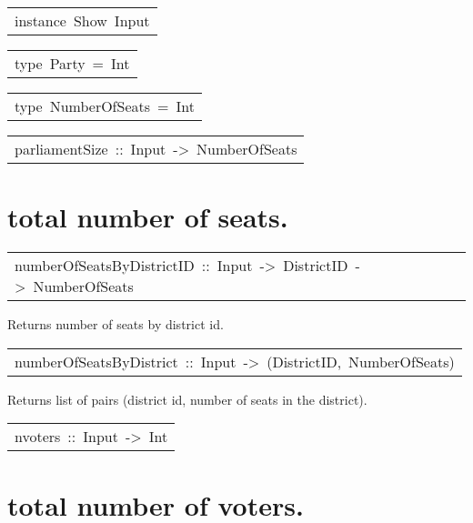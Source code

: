 \begin{haddockdesc}
\item[\begin{tabular}{@{}l}
instance\ Show\ Input
\end{tabular}]
\end{haddockdesc}
\begin{haddockdesc}
\item[\begin{tabular}{@{}l}
type\ Party\ =\ Int
\end{tabular}]
\end{haddockdesc}
\begin{haddockdesc}
\item[\begin{tabular}{@{}l}
type\ NumberOfSeats\ =\ Int
\end{tabular}]
\end{haddockdesc}
\begin{haddockdesc}
\item[\begin{tabular}{@{}l}
parliamentSize\ ::\ Input\ ->\ NumberOfSeats
\end{tabular}]\haddockbegindoc
\section*{total number of seats.}
\end{haddockdesc}
\begin{haddockdesc}
\item[\begin{tabular}{@{}l}
numberOfSeatsByDistrictID\ ::\ Input\ ->\ DistrictID\ ->\ NumberOfSeats
\end{tabular}]\haddockbegindoc
Returns number of seats by district id.\par

\end{haddockdesc}
\begin{haddockdesc}
\item[\begin{tabular}{@{}l}
numberOfSeatsByDistrict\ ::\ Input\ ->\ {\char 91}(DistrictID,\ NumberOfSeats){\char 93}
\end{tabular}]\haddockbegindoc
Returns list of pairs (district id, number of seats in the district).\par

\end{haddockdesc}
\begin{haddockdesc}
\item[\begin{tabular}{@{}l}
nvoters\ ::\ Input\ ->\ Int
\end{tabular}]\haddockbegindoc
\section*{total number of voters.}
\end{haddockdesc}
